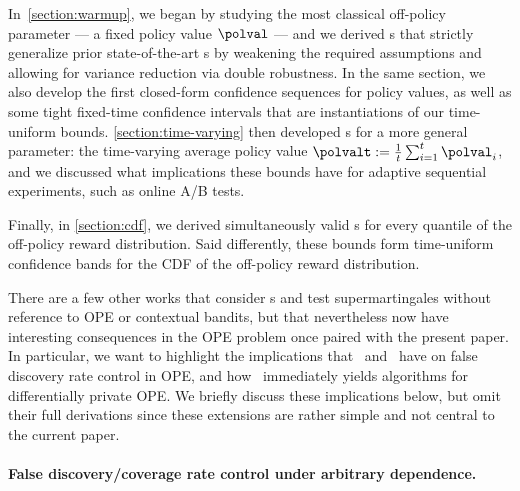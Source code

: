 In~\cref{section:warmup}, we began by studying the most classical off-policy parameter --- a fixed policy value $\polval$ --- and we derived \cs{}s that strictly generalize prior state-of-the-art \cs{}s by weakening the required assumptions and allowing for variance reduction via double robustness. In the same section, we also develop the first closed-form confidence sequences for policy values, as well as some tight fixed-time confidence intervals that are instantiations of our time-uniform bounds. \cref{section:time-varying} then developed \cs{}s for a more general parameter: the time-varying average policy value $\polvalt := \frac{1}{t}\sum_{i=1}^t \polval_i$, and we discussed what implications these bounds have for adaptive sequential experiments, such as online A/B tests.

Finally, in \cref{section:cdf}, we derived simultaneously valid \cs{}s for every quantile of the off-policy reward distribution. Said differently, these bounds form time-uniform confidence bands for the CDF of the off-policy reward distribution.

There are a few other works that consider \cs{}s and test supermartingales without reference to OPE or contextual bandits, but that nevertheless now have interesting consequences in the OPE problem once paired with the present paper. In particular, we want to highlight the implications that~\citet{wang2020false} and~\citet{xu2022post} have on false discovery rate control in OPE\@, and how~\citet{waudby2022locally} immediately yields algorithms for differentially private OPE\@. We briefly discuss these implications below, but omit their full derivations since these extensions are rather simple and not central to the current paper.

\paragraph{False discovery/coverage rate control under arbitrary dependence.}

